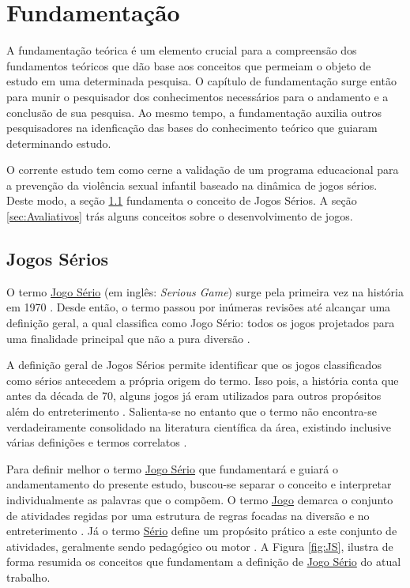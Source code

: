 \chapter{Fundamentação}\label{ch:Fundamentacao}

A fundamentação teórica é um elemento crucial para a compreensão dos fundamentos teóricos que dão base aos conceitos que permeiam o objeto de estudo em uma determinada pesquisa. O capítulo de fundamentação surge então para munir o pesquisador dos conhecimentos necessários para o andamento e a conclusão de sua pesquisa. Ao mesmo tempo, a fundamentação auxilia outros pesquisadores na idenficação das bases do conhecimento teórico que guiaram determinando estudo. 

O corrente estudo tem como cerne a validação de um programa educacional para a prevenção da violência sexual infantil baseado na dinâmica de jogos sérios. Deste modo, a seção \ref{sec:JogosSerios} fundamenta o conceito de Jogos Sérios. A seção \ref{sec:Avaliativos} trás alguns conceitos sobre o desenvolvimento de jogos. %

\vspace{0.75cm}

\section{Jogos Sérios}\label{sec:JogosSerios}

O termo \underline{Jo}g\underline{o Sério} (em inglês: \textit{Serious Game}) surge pela primeira vez na história em 1970 \cite{clark1970serious}. Desde então, o termo passou por inúmeras revisões até alcançar uma definição geral, a qual classifica como Jogo Sério: todos os jogos projetados para uma finalidade principal que não a pura diversão \cite{michael2005serious, de2015aprendizagem, laamarti2014overview}.

A definição geral de Jogos Sérios permite identificar que os jogos classificados como sérios antecedem a própria origem do termo. Isso pois, a história conta que antes da década de 70, alguns jogos já eram utilizados para outros propósitos além do entreterimento \cite{wilkinson2016brief}. Salienta-se no entanto que o termo não encontra-se verdadeiramente consolidado na literatura científica da área, existindo inclusive várias definições e termos correlatos \cite{pourabdollahian2012serious}.

Para definir melhor o termo \underline{Jo}g\underline{o Sério} que fundamentará e guiará o andamentamento do presente estudo, buscou-se separar o conceito e interpretar individualmente as palavras que o compõem. O termo \underline{Jo}g\underline{o} demarca o conjunto de atividades regidas por uma estrutura de regras focadas na diversão e no entreterimento \cite{kishimoto1994jogo}. Já o termo \underline{Sério} define um propósito prático a este conjunto de atividades, geralmente sendo pedagógico ou motor \cite{schroeder2017wobu, baptista2017jogos}. %
A Figura \ref{fig:JS}, ilustra de forma resumida os conceitos que fundamentam a definição de \underline{Jo}g\underline{o Sério} do atual trabalho.  

